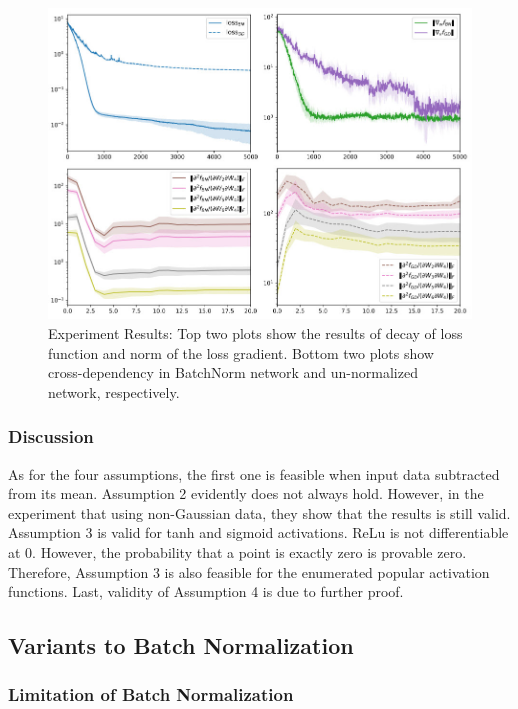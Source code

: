 \documentclass{article}
\begin{document}
\begin{figure}[!ht]
	\centering
    \includegraphics[width=\textwidth]{pics/batchNorm/decoupling_experiment.jpg}
	\caption{Experiment Results: Top two plots show the results of decay of loss function and norm of the loss gradient. Bottom two plots show cross-dependency in BatchNorm network and un-normalized network, respectively.}
	\label{fig:decouplingexperiment}
\end{figure}

\subsubsection{Discussion}

As for the four assumptions, the first one is feasible when input data subtracted from its mean. Assumption 2 evidently does not always hold. However, in the experiment that using non-Gaussian data, they show that the results is still valid. Assumption 3 is valid for tanh and sigmoid activations. ReLu is not differentiable at 0. However, the probability that a point is exactly zero is provable zero. Therefore, Assumption 3 is also feasible for the enumerated popular activation functions. Last, validity of Assumption 4 is due to further proof. 

\subsection{Variants to Batch Normalization}

\subsubsection{Limitation of Batch Normalization}
\end{document}

